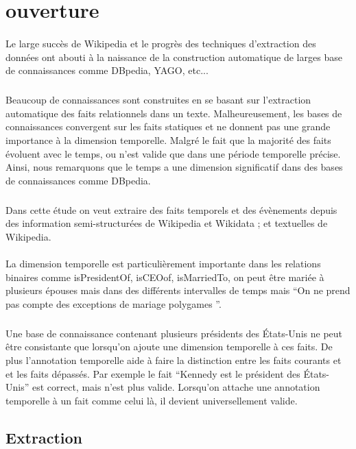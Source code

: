 \section*{ouverture}
\paragraph{}
Le large succès de Wikipedia et le progrès des techniques d’extraction des données ont abouti à la naissance de la construction automatique  de larges base de connaissances comme DBpedia, YAGO, etc...
\subparagraph{}
Beaucoup de connaissances sont construites en se basant sur l’extraction automatique des faits relationnels dans un texte.
Malheureusement, les bases de connaissances convergent sur les faits statiques et ne donnent pas une grande importance à la dimension temporelle.
Malgré le fait que la majorité des faits évoluent avec le temps, ou n'est valide que dans une période temporelle précise.
Ainsi, nous remarquons que le temps a une dimension significatif dans des bases de connaissances comme DBpedia.
\subparagraph{}
Dans cette étude on veut extraire des faits temporels et des évènements depuis des information semi-structurées de Wikipedia et Wikidata ; et textuelles de Wikipedia.
\paragraph{}
La dimension temporelle est particulièrement importante dans les relations binaires comme isPresidentOf, isCEOof, isMarriedTo, on peut être mariée à plusieurs épouses mais dans des différents intervalles de temps mais “On ne prend pas compte des exceptions de mariage polygames ”.
\subparagraph{}
Une base de connaissance contenant plusieurs présidents des États-Unis ne peut être consistante que lorsqu’on ajoute une dimension temporelle à ces faits. De plus l’annotation temporelle aide à faire la distinction entre les faits courants et et les faits dépassés.
Par exemple le fait “Kennedy est le président des États-Unis” est correct, mais n'est plus valide.
Lorsqu’on attache une annotation temporelle à un fait comme celui là, il devient universellement valide.
\subsection*{Extraction}
